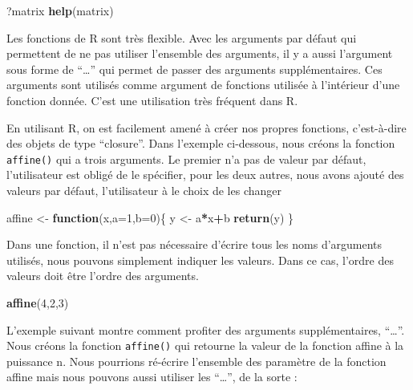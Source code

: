 \documentclass[]{article}
\newenvironment{Shaded}{\begin{snugshade}}{\end{snugshade}}
\newcommand{\ControlFlowTok}[1]{\textcolor[rgb]{0.13,0.29,0.53}{\textbf{#1}}}
\newcommand{\DataTypeTok}[1]{\textcolor[rgb]{0.13,0.29,0.53}{#1}}
\newcommand{\DecValTok}[1]{\textcolor[rgb]{0.00,0.00,0.81}{#1}}
\newcommand{\KeywordTok}[1]{\textcolor[rgb]{0.13,0.29,0.53}{\textbf{#1}}}
\newcommand{\NormalTok}[1]{#1}
\newcommand{\OperatorTok}[1]{\textcolor[rgb]{0.81,0.36,0.00}{\textbf{#1}}}
\newcommand{\StringTok}[1]{\textcolor[rgb]{0.31,0.60,0.02}{#1}}
\begin{document}
\begin{Shaded}
\begin{Highlighting}[]
\NormalTok{?matrix}
\KeywordTok{help}\NormalTok{(matrix)}
\end{Highlighting}
\end{Shaded}

Les fonctions de R sont très flexible. Avec les arguments par défaut qui permettent de ne pas utiliser l'ensemble des arguments, il y a aussi l'argument sous forme de ``\ldots{}'' qui permet de passer des arguments supplémentaires. Ces arguments sont utilisés comme argument de fonctions utilisée à l'intérieur d'une fonction donnée. C'est une utilisation très fréquent dans R.

En utilisant R, on est facilement amené à créer nos propres fonctions, c'est-à-dire des objets de type ``closure''. Dans l'exemple ci-dessous, nous créons la fonction \texttt{affine()} qui a trois arguments. Le premier n'a pas de valeur par défaut, l'utilisateur est obligé de le spécifier, pour les deux autres, nous avons ajouté des valeurs par défaut, l'utilisateur à le choix de les changer

\begin{Shaded}
\begin{Highlighting}[]
\NormalTok{  affine <-}\StringTok{ }\ControlFlowTok{function}\NormalTok{(x,}\DataTypeTok{a=}\DecValTok{1}\NormalTok{,}\DataTypeTok{b=}\DecValTok{0}\NormalTok{)\{}
\NormalTok{    y <-}\StringTok{ }\NormalTok{a}\OperatorTok{*}\NormalTok{x}\OperatorTok{+}\NormalTok{b}
    \KeywordTok{return}\NormalTok{(y)}
\NormalTok{  \}}
\end{Highlighting}
\end{Shaded}

Dans une fonction, il n'est pas nécessaire d'écrire tous les noms d'arguments utilisés, nous pouvons simplement indiquer les valeurs. Dans ce cas, l'ordre des valeurs doit être l'ordre des arguments.

\begin{Shaded}
\begin{Highlighting}[]
\KeywordTok{affine}\NormalTok{(}\DecValTok{4}\NormalTok{,}\DecValTok{2}\NormalTok{,}\DecValTok{3}\NormalTok{)}
\end{Highlighting}
\end{Shaded}

L'exemple suivant montre comment profiter des arguments supplémentaires, ``\ldots{}''. Nous créons la fonction \texttt{affine()} qui retourne la valeur de la fonction affine à la puissance n. Nous pourrions ré-écrire l'ensemble des paramètre de la fonction affine mais nous pouvons aussi utiliser les ``\ldots{}'', de la sorte :
\end{document}
